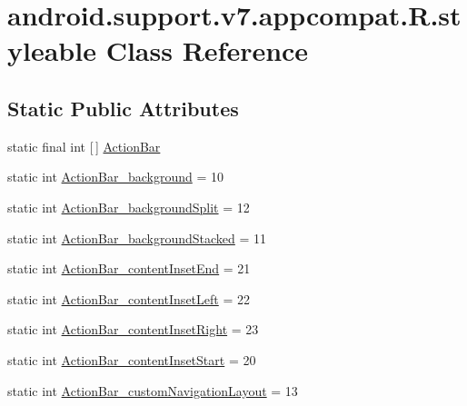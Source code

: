 \hypertarget{classandroid_1_1support_1_1v7_1_1appcompat_1_1R_1_1styleable}{}\section{android.\+support.\+v7.\+appcompat.\+R.\+styleable Class Reference}
\label{classandroid_1_1support_1_1v7_1_1appcompat_1_1R_1_1styleable}
\subsection*{Static Public Attributes}
\begin{DoxyCompactItemize}
\item 
static final int \mbox{[}$\,$\mbox{]} \hyperlink{classandroid_1_1support_1_1v7_1_1appcompat_1_1R_1_1styleable_a5941dc15714398e9ec9afaa0155cc1cf}{Action\+Bar}
\item 
static int \hyperlink{classandroid_1_1support_1_1v7_1_1appcompat_1_1R_1_1styleable_a54388d3e1ae62677a3056097acbf7069}{Action\+Bar\+\_\+background} = 10
\item 
static int \hyperlink{classandroid_1_1support_1_1v7_1_1appcompat_1_1R_1_1styleable_ad35a58b3583d91f8dac919846b6a99c1}{Action\+Bar\+\_\+background\+Split} = 12
\item 
static int \hyperlink{classandroid_1_1support_1_1v7_1_1appcompat_1_1R_1_1styleable_afc6f542df304273e42d5109d94293071}{Action\+Bar\+\_\+background\+Stacked} = 11
\item 
static int \hyperlink{classandroid_1_1support_1_1v7_1_1appcompat_1_1R_1_1styleable_a65308af43525946cf793f406019f7925}{Action\+Bar\+\_\+content\+Inset\+End} = 21
\item 
static int \hyperlink{classandroid_1_1support_1_1v7_1_1appcompat_1_1R_1_1styleable_ace29bce78f0578d736528d50188dee32}{Action\+Bar\+\_\+content\+Inset\+Left} = 22
\item 
static int \hyperlink{classandroid_1_1support_1_1v7_1_1appcompat_1_1R_1_1styleable_a03934a093a17b752258be0f5b6fef2f6}{Action\+Bar\+\_\+content\+Inset\+Right} = 23
\item 
static int \hyperlink{classandroid_1_1support_1_1v7_1_1appcompat_1_1R_1_1styleable_ac85953ed4627c156cb89dc481a4deaee}{Action\+Bar\+\_\+content\+Inset\+Start} = 20
\item 
static int \hyperlink{classandroid_1_1support_1_1v7_1_1appcompat_1_1R_1_1styleable_a33a27d2f5325f52eae7806c7b4498719}{Action\+Bar\+\_\+custom\+Navigation\+Layout} = 13

\end{DoxyCompactItemize}
